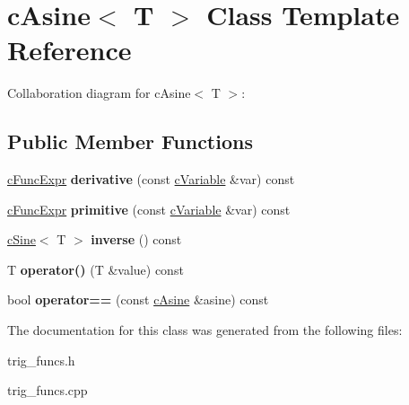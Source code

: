 \hypertarget{classcAsine}{\section{c\-Asine$<$ T $>$ Class Template Reference}
\label{classcAsine}
}


Collaboration diagram for c\-Asine$<$ T $>$\-:
\subsection*{Public Member Functions}
\begin{DoxyCompactItemize}
\item 
\hypertarget{classcAsine_a1bc52b0870c1f71cb7edca666c4a61a4}{\hyperlink{classcFuncExpr}{c\-Func\-Expr} {\bfseries derivative} (const \hyperlink{classcVariable}{c\-Variable} \&var) const }\label{classcAsine_a1bc52b0870c1f71cb7edca666c4a61a4}

\item 
\hypertarget{classcAsine_a6ab57802b37b274f9b138c7ae75723ad}{\hyperlink{classcFuncExpr}{c\-Func\-Expr} {\bfseries primitive} (const \hyperlink{classcVariable}{c\-Variable} \&var) const }\label{classcAsine_a6ab57802b37b274f9b138c7ae75723ad}

\item 
\hypertarget{classcAsine_adfe3473167f8e9e4db3ee2db8c7cdfdb}{\hyperlink{classcSine}{c\-Sine}$<$ T $>$ {\bfseries inverse} () const }\label{classcAsine_adfe3473167f8e9e4db3ee2db8c7cdfdb}

\item 
\hypertarget{classcAsine_af9452f2ec80f49d486ce291d04732630}{T {\bfseries operator()} (T \&value) const }\label{classcAsine_af9452f2ec80f49d486ce291d04732630}

\item 
\hypertarget{classcAsine_a523fe3a7e8d91fd3f4414b3075edce0f}{bool {\bfseries operator==} (const \hyperlink{classcAsine}{c\-Asine} \&asine) const }\label{classcAsine_a523fe3a7e8d91fd3f4414b3075edce0f}

\end{DoxyCompactItemize}


The documentation for this class was generated from the following files\-:\begin{DoxyCompactItemize}
\item 
trig\-\_\-funcs.\-h\item 
trig\-\_\-funcs.\-cpp\end{DoxyCompactItemize}
